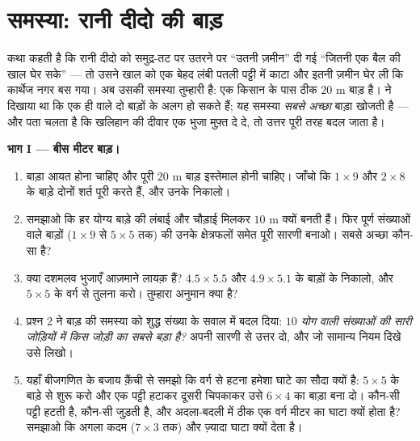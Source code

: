 \section{समस्या: रानी दीदो की बाड़}

\begin{problem}
\label{pb:g6:measure:1}
कथा कहती है कि रानी दीदो को समुद्र-तट पर उतरने पर ``उतनी ज़मीन''
दी गई ``जितनी एक बैल की खाल घेर सके'' --- तो उसने खाल को एक
बेहद लंबी पतली पट्टी में काटा और इतनी ज़मीन घेर ली कि कार्थेज
नगर बस गया। अब उसकी समस्या तुम्हारी है: एक किसान के पास ठीक
$20$ m बाड़ है।  ने दिखाया था कि एक ही
 वाले दो बाड़ों के  अलग हो सकते हैं; यह समस्या
\emph{सबसे अच्छा} बाड़ा खोजती है --- और पता चलता है कि खलिहान की
दीवार एक भुजा मुफ़्त दे दे, तो उत्तर पूरी तरह बदल जाता है।

\medskip
\noindent\textbf{भाग I --- बीस मीटर बाड़।}
\begin{enumerate}
  \item बाड़ा आयत होना चाहिए और पूरी $20$ m बाड़ इस्तेमाल होनी
        चाहिए। जाँचो कि $1 \times 9$ और $2 \times 8$ के बाड़े
        दोनों शर्त पूरी करते हैं, और उनके  निकालो।
  \item समझाओ कि हर योग्य बाड़े की लंबाई और चौड़ाई मिलकर $10$ m
        क्यों बनती हैं। फिर पूर्ण संख्याओं वाले बाड़ों
        ($1 \times 9$ से $5 \times 5$ तक) की उनके क्षेत्रफलों
        समेत पूरी सारणी बनाओ। सबसे अच्छा कौन-सा है?
  \item क्या दशमलव भुजाएँ आज़माने लायक़ हैं? $4.5 \times 5.5$ और
        $4.9 \times 5.1$ के बाड़ों के  निकालो, और
        $5 \times 5$ के वर्ग से तुलना करो। तुम्हारा अनुमान
        क्या है?
  \item प्रश्न 2 ने बाड़ की समस्या को शुद्ध संख्या के सवाल में
        बदल दिया: \emph{$10$ योग वाली संख्याओं की सारी जोड़ियों
        में किस जोड़ी का  सबसे बड़ा है?} अपनी सारणी से उत्तर
        दो, और जो सामान्य नियम दिखे उसे लिखो।
  \item यहाँ बीजगणित के बजाय क़ैंची से समझो कि वर्ग से हटना
        हमेशा घाटे का सौदा क्यों है: $5 \times 5$ के बाड़े से
        शुरू करो और एक पट्टी हटाकर दूसरी चिपकाकर उसे
        $6 \times 4$ का बाड़ा बना दो। कौन-सी पट्टी हटती है,
        कौन-सी जुड़ती है, और अदला-बदली में ठीक एक वर्ग मीटर का
        घाटा क्यों होता है? समझाओ कि अगला कदम ($7 \times 3$ तक)
        और ज़्यादा घाटा क्यों देता है।
\end{enumerate}


\end{problem}
